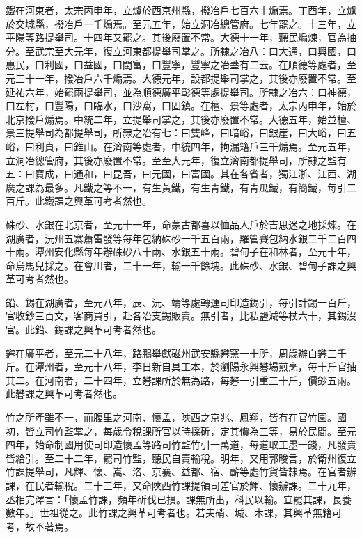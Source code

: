 \begin{pinyinscope}
 鐵在河東者，太宗丙申年，立爐於西京州縣，撥冶戶七百六十煽焉。丁酉年，立爐於交城縣，撥冶戶一千煽焉。至元五年，始立洞冶總管府。七年罷之。十三年，立平陽等路提舉司。十四年又罷之。其後廢置不常。大德十一年，聽民煽煉，官為抽分。至武宗至大元年，復立河東都提舉司掌之。所隸之冶八：曰大通，曰興國，曰惠民，曰利國，曰益國，曰閏富，曰豐寧，豐寧之冶蓋有二云。在順德等處者，至元三十一年，撥冶戶六千煽焉。大德元年，設都提舉司掌之，其後亦廢置不常。至延祐六年，始罷兩提舉司，並為順德廣平彰德等處提舉司。所隸之冶六：曰神德，曰左村，曰豐陽，曰臨水，曰沙窩，曰固鎮。在檀、景等處者，太宗丙申年，始於北京撥戶煽焉。中統二年，立提舉司掌之，其後亦廢置不常。大德五年，始並檀、景三提舉司為都提舉司，所隸之冶有七：曰雙峰，曰暗峪，曰銀崖，曰大峪，曰五峪，曰利貞，曰錐山。在濟南等處者，中統四年，拘漏籍戶三千煽焉。至元五年，立洞冶總管府，其後亦廢置不常。至至大元年，復立濟南都提舉司，所隸之監有五：曰寶成，曰通和，曰昆吾，曰元國，曰富國。其在各省者，獨江浙、江西、湖廣之課為最多。凡鐵之等不一，有生黃鐵，有生青鐵，有青瓜鐵，有簡鐵，每引二百斤。此鐵課之興革可考者然也。



 硃砂、水銀在北京者，至元十一年，命蒙古都喜以恤品人戶於吉思迷之地採煉。在湖廣者，沅州五寨蕭雷發等每年包納硃砂一千五百兩，羅管賽包納水銀二千二百四十兩。潭州安化縣每年辦硃砂八十兩、水銀五十兩。碧甸子在和林者，至元十年，命烏馬兒採之。在會川者，二十一年，輸一千餘塊。此硃砂、水銀、碧甸子課之興革可考者然也。



 鉛、錫在湖廣者，至元八年，辰、沅、靖等處轉運司印造錫引，每引計錫一百斤，官收鈔三百文，客商買引，赴各冶支錫販賣。無引者，比私鹽減等杖六十，其錫沒官。此鉛、錫課之興革可考者然也。



 礬在廣平者，至元二十八年，路鵬舉獻磁州武安縣礬窯一十所，周歲辦白礬三千斤。在潭州者，至元十八年，李日新自具工本，於瀏陽永興礬場煎烹，每十斤官抽其二。在河南者，二十四年，立礬課所於無為路，每礬一引重三十斤，價鈔五兩。此礬課之興革可考者然也。



 竹之所產雖不一，而腹里之河南、懷孟，陜西之京兆、鳳翔，皆有在官竹園。國初，皆立司竹監掌之，每歲令稅課所官以時採斫，定其價為三等，易於民間。至元四年，始命制國用使司印造懷孟等路司竹監竹引一萬道，每道取工墨一錢，凡發賣皆給引。至二十二年，罷司竹監，聽民自賣輸稅。明年，又用郭畯言，於衛州復立竹課提舉司，凡輝、懷、嵩、洛、京襄、益都、宿、蘄等處竹貨皆隸焉。在官者辦課，在民者輸稅。二十三年，又命陜西竹課提領司差官於輝、懷辦課。二十九年，丞相完澤言：「懷孟竹課，頻年斫伐已損。課無所出，科民以輸。宜罷其課，長養數年。」世祖從之。此竹課之興革可考者也。若夫硝、堿、木課，其興革無籍可考，故不著焉。




\end{pinyinscope}
